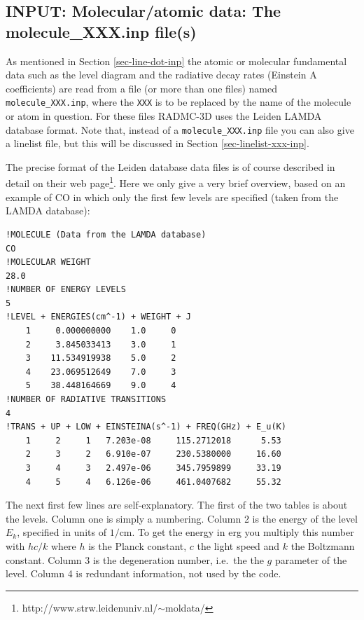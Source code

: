 \documentclass{report}
\newenvironment{asciibox}%
  {\begin{list}{}{%
    \setlength{\topsep}{0.5em}%
    \setlength{\parskip}{0em}%
    \setlength{\parsep}{0em}%
    \setlength{\itemsep}{0em}%
    \setlength{\rightmargin}{0em}%
    \setlength{\leftmargin}{3.0em}%
    \setlength{\labelsep}{1em}%
    \setlength{\labelwidth}{2em}%
  }\normalfont\footnotesize\item}
  {\end{list}}
\begin{document}
\subsection{INPUT: Molecular/atomic data: The molecule\_XXX.inp file(s)}
\label{sec-molecule-xxx-inp}
\label{sec-leiden-format}
%
As mentioned in Section \ref{sec-line-dot-inp} the atomic or molecular
fundamental data such as the level diagram and the radiative decay rates
(Einstein A coefficients) are read from a file (or more than one files)
named {\small\tt molecule\_XXX.inp}, where the {\small\tt XXX} is to be
replaced by the name of the molecule or atom in question. For these files
RADMC-3D uses the Leiden LAMDA database format. Note that, instead of
a {\small\tt molecule\_XXX.inp} file you can also give a linelist file,
but this will be discussed in Section \ref{sec-linelist-xxx-inp}.

The precise format of the Leiden database data files is of course described
in detail on their web
page\footnote{http://www.strw.leidenuniv.nl/$\sim$moldata/}. Here we only
give a very brief overview, based on an example of CO in which only the
first few levels are specified (taken from the LAMDA database):
\begin{asciibox}\begin{verbatim}
!MOLECULE (Data from the LAMDA database)
CO
!MOLECULAR WEIGHT
28.0
!NUMBER OF ENERGY LEVELS
5
!LEVEL + ENERGIES(cm^-1) + WEIGHT + J
    1     0.000000000	 1.0	 0
    2     3.845033413	 3.0	 1
    3    11.534919938	 5.0	 2
    4    23.069512649	 7.0	 3
    5    38.448164669	 9.0	 4
!NUMBER OF RADIATIVE TRANSITIONS
4
!TRANS + UP + LOW + EINSTEINA(s^-1) + FREQ(GHz) + E_u(K)
    1     2     1   7.203e-08     115.2712018      5.53
    2     3     2   6.910e-07     230.5380000     16.60
    3     4     3   2.497e-06     345.7959899     33.19
    4     5     4   6.126e-06     461.0407682     55.32
\end{verbatim}\end{asciibox}

The next first few lines are self-explanatory. The first of the two tables
is about the levels. Column one is simply a numbering. Column 2 is the
energy of the level $E_k$, specified in units of $1/$cm. To get the energy in
erg you multiply this number with $hc/k$ where $h$ is the Planck constant,
$c$ the light speed and $k$ the Boltzmann constant. Column 3 is the
degeneration number, i.e.\ the the $g$ parameter of the level. Column 4
is redundant information, not used by the code.
\end{document}
